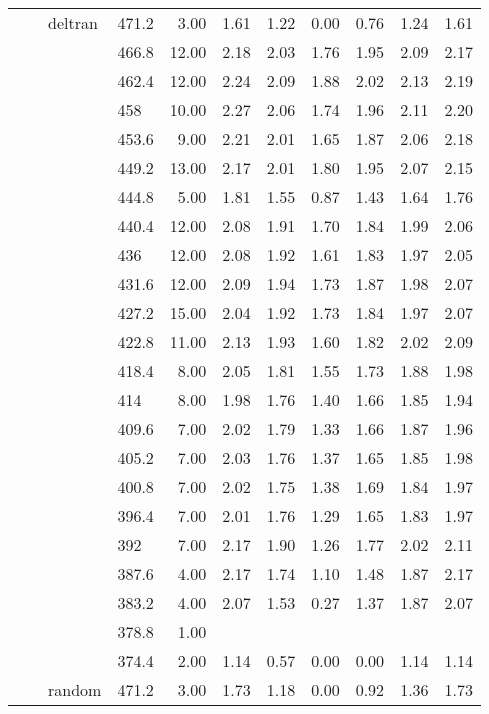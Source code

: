 \begin{longtable}{llllrrrrrrr}
   &  & deltran & 471.2 & 3.00 & 1.61 & 1.22 & 0.00 & 0.76 & 1.24 & 1.61 \\ 
   &  &  & 466.8 & 12.00 & 2.18 & 2.03 & 1.76 & 1.95 & 2.09 & 2.17 \\ 
   &  &  & 462.4 & 12.00 & 2.24 & 2.09 & 1.88 & 2.02 & 2.13 & 2.19 \\ 
   &  &  & 458 & 10.00 & 2.27 & 2.06 & 1.74 & 1.96 & 2.11 & 2.20 \\ 
   &  &  & 453.6 & 9.00 & 2.21 & 2.01 & 1.65 & 1.87 & 2.06 & 2.18 \\ 
   &  &  & 449.2 & 13.00 & 2.17 & 2.01 & 1.80 & 1.95 & 2.07 & 2.15 \\ 
   &  &  & 444.8 & 5.00 & 1.81 & 1.55 & 0.87 & 1.43 & 1.64 & 1.76 \\ 
   &  &  & 440.4 & 12.00 & 2.08 & 1.91 & 1.70 & 1.84 & 1.99 & 2.06 \\ 
   &  &  & 436 & 12.00 & 2.08 & 1.92 & 1.61 & 1.83 & 1.97 & 2.05 \\ 
   &  &  & 431.6 & 12.00 & 2.09 & 1.94 & 1.73 & 1.87 & 1.98 & 2.07 \\ 
   &  &  & 427.2 & 15.00 & 2.04 & 1.92 & 1.73 & 1.84 & 1.97 & 2.07 \\ 
   &  &  & 422.8 & 11.00 & 2.13 & 1.93 & 1.60 & 1.82 & 2.02 & 2.09 \\ 
   &  &  & 418.4 & 8.00 & 2.05 & 1.81 & 1.55 & 1.73 & 1.88 & 1.98 \\ 
   &  &  & 414 & 8.00 & 1.98 & 1.76 & 1.40 & 1.66 & 1.85 & 1.94 \\ 
   &  &  & 409.6 & 7.00 & 2.02 & 1.79 & 1.33 & 1.66 & 1.87 & 1.96 \\ 
   &  &  & 405.2 & 7.00 & 2.03 & 1.76 & 1.37 & 1.65 & 1.85 & 1.98 \\ 
   &  &  & 400.8 & 7.00 & 2.02 & 1.75 & 1.38 & 1.69 & 1.84 & 1.97 \\ 
   &  &  & 396.4 & 7.00 & 2.01 & 1.76 & 1.29 & 1.65 & 1.83 & 1.97 \\ 
   &  &  & 392 & 7.00 & 2.17 & 1.90 & 1.26 & 1.77 & 2.02 & 2.11 \\ 
   &  &  & 387.6 & 4.00 & 2.17 & 1.74 & 1.10 & 1.48 & 1.87 & 2.17 \\ 
   &  &  & 383.2 & 4.00 & 2.07 & 1.53 & 0.27 & 1.37 & 1.87 & 2.07 \\ 
   &  &  & 378.8 & 1.00 &  &  &  &  &  &  \\ 
   &  &  & 374.4 & 2.00 & 1.14 & 0.57 & 0.00 & 0.00 & 1.14 & 1.14 \\ 
   &  & random & 471.2 & 3.00 & 1.73 & 1.18 & 0.00 & 0.92 & 1.36 & 1.73 \\ 

\end{longtable}
